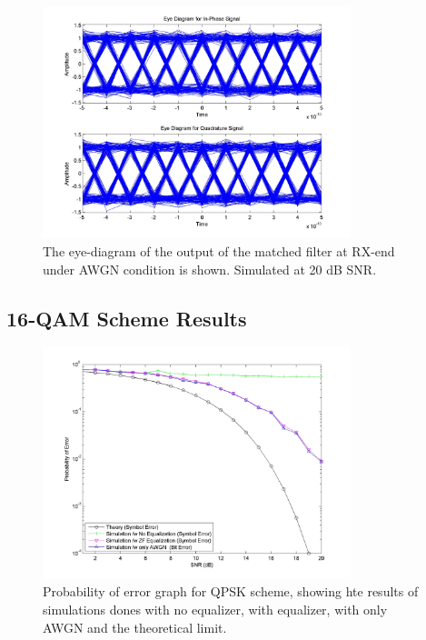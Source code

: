 \documentclass[]{article}
\begin{document}
\begin{figure}[H]
\centering
\includegraphics[width=0.8\textwidth]{equalized_eye_qpsk20.jpg}
\caption{The eye-diagram of the output of the matched filter at RX-end under AWGN condition is shown. Simulated at 20 dB SNR. \label{fig:qpEyeAWGN}}
\end{figure}

\subsection{16-QAM Scheme Results}

\begin{figure}[H]
\centering
\includegraphics[width=0.8\textwidth]{qam16SNR.jpg}
\caption{Probability of error graph for QPSK scheme, showing hte results of simulations dones with no equalizer, with equalizer, with only AWGN and the theoretical limit. \label{fig:qamBER}}
\end{figure}
\end{document}
